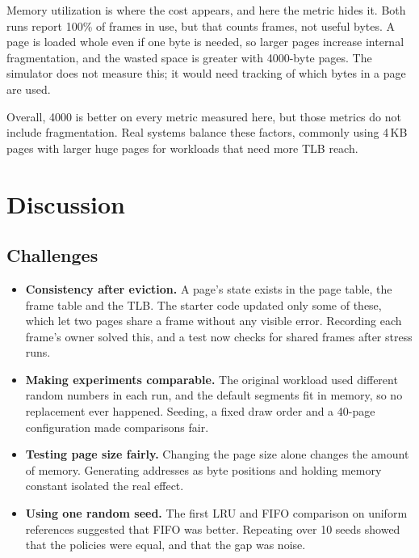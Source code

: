 \documentclass[11pt]{article}
\begin{document}
Memory utilization is where the cost appears, and here the metric hides it. Both
runs report 100\% of frames in use, but that counts frames, not useful bytes. A page
is loaded whole even if one byte is needed, so larger pages increase internal
fragmentation, and the wasted space is greater with 4000-byte pages. The simulator
does not measure this; it would need tracking of which bytes in a page are used.

Overall, 4000 is better on every metric measured here, but those metrics do not
include fragmentation. Real systems balance these factors, commonly using 4\,KB pages
with larger huge pages for workloads that need more TLB reach.

\section{Discussion}

\subsection{Challenges}
\begin{itemize}
  \item \textbf{Consistency after eviction.} A page's state exists in the page table,
        the frame table and the TLB. The starter code updated only some of these, which
        let two pages share a frame without any visible error. Recording each frame's
        owner solved this, and a test now checks for shared frames after stress runs.
  \item \textbf{Making experiments comparable.} The original workload used different
        random numbers in each run, and the default segments fit in memory, so no
        replacement ever happened. Seeding, a fixed draw order and a 40-page
        configuration made comparisons fair.
  \item \textbf{Testing page size fairly.} Changing the page size alone changes the
        amount of memory. Generating addresses as byte positions and holding memory
        constant isolated the real effect.
  \item \textbf{Using one random seed.} The first LRU and FIFO comparison on uniform
        references suggested that FIFO was better. Repeating over 10 seeds showed that
        the policies were equal, and that the gap was noise.
\end{itemize}
\end{document}
